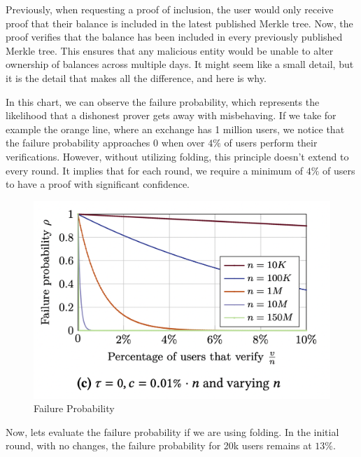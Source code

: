 Previously, when requesting a proof of inclusion, the user would only receive proof that their balance is included in the latest published Merkle tree. Now, the proof verifies that the balance has been included in every previously published Merkle tree.
This ensures that any malicious entity would be unable to alter ownership of balances across multiple days. It might seem like a small detail, but it is the detail that makes all the difference, and here is why.


In this chart, we can observe the failure probability, which represents the likelihood that a dishonest prover gets away with misbehaving.
If we take for example the orange line, where an exchange has 1 million users, we notice that the failure probability approaches 0 when over $4\%$ of users perform their verifications.
However, without utilizing folding, this principle doesn't extend to every round. It implies that for each round, we require a minimum of $4\%$ of users to have a proof with significant confidence.


\begin{figure}[H]
   \centering
   \includegraphics[width=130mm]{FailureProbability.png}
   \caption{Failure Probability \cite{GP21}}
   \label{overflow}
   \end{figure}


Now, lets evaluate the failure probability if we are using folding.
In the initial round, with no changes, the failure probability for 20k users remains at $13\%$.


